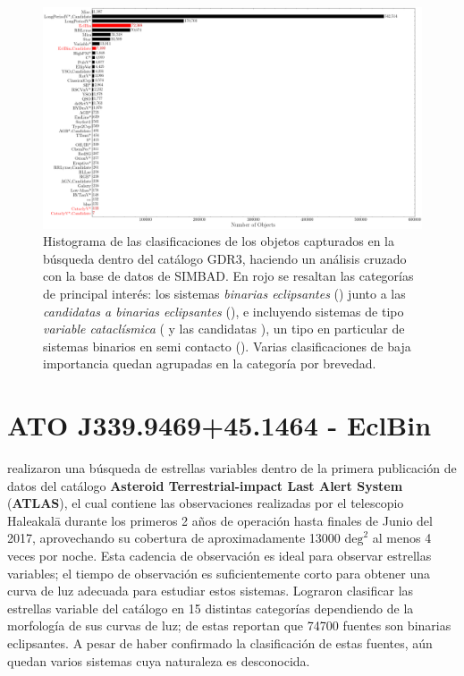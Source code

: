 \begin{figure}[!ht]
	\centering
	\includegraphics[scale=0.32]{Muestra/Secciones/Figures/Figura Gaia SIMBAD Busqueda Resultados.png}
	\caption{Histograma de las clasificaciones de los objetos capturados en la
	búsqueda dentro del catálogo GDR3, haciendo un análisis cruzado con la base
	de datos de SIMBAD. En rojo se resaltan las categorías de principal interés:
	los sistemas \textit{binarias eclipsantes} () junto a las
	\textit{candidatas a binarias eclipsantes} (), e
	incluyendo sistemas de tipo \textit{variable cataclísmica} (
	y las candidatas ), un tipo en particular de
	sistemas binarios en semi contacto
	(). Varias
	clasificaciones de baja importancia quedan agrupadas en la categoría
	 por brevedad.}
	\label{figuraBusquedaSimbadHistograma}
\end{figure}

\section{ATO J339.9469+45.1464 - EclBin}

 realizaron una búsqueda de estrellas
variables dentro de la primera publicación de datos del catálogo
\textbf{Asteroid Terrestrial-impact Last Alert System} (\textbf{ATLAS}), el cual
contiene las observaciones realizadas por el telescopio Haleakalā durante los
primeros 2 años de operación hasta finales de Junio del 2017, aprovechando su
cobertura de aproximadamente \num{13000} $\mathrm{deg}^2$ al menos 4 veces por
noche. Esta cadencia de observación es ideal para observar estrellas variables;
el tiempo de observación es suficientemente corto para obtener una curva de luz
adecuada para estudiar estos sistemas. Lograron clasificar las estrellas
variable del catálogo en 15 distintas categorías dependiendo de la morfología de
sus curvas de luz; de estas reportan que \num{74700} fuentes son binarias
eclipsantes. A pesar de haber confirmado la clasificación de estas fuentes, aún
quedan varios sistemas cuya naturaleza es desconocida.

